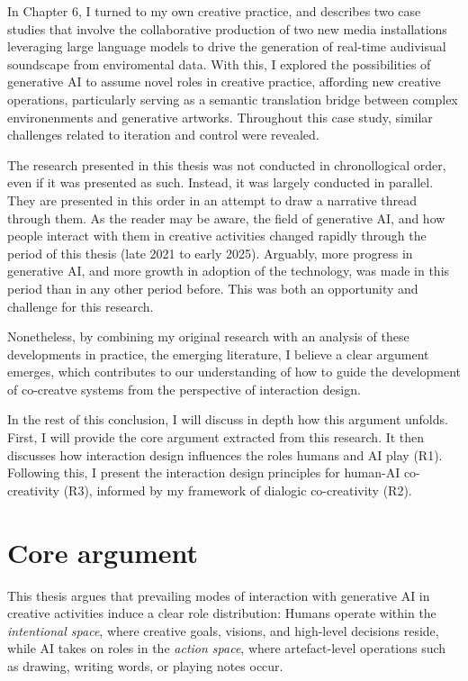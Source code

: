 In Chapter 6, I turned to my own creative practice, and describes two case studies that involve the collaborative production of two new media installations leveraging large language models to drive the generation of real-time audivisual soundscape from enviromental data. With this, I explored the possibilities of generative AI to assume novel roles in creative practice, affording new creative operations, particularly serving as a semantic translation bridge between complex environenments and generative artworks. Throughout this case study, similar challenges related to iteration and control were revealed. 

The research presented in this thesis was not conducted in chronollogical order, even if it was presented as such. Instead, it was largely conducted in parallel. They are presented in this order in an attempt to draw a narrative thread through them. As the reader may be aware, the field of generative AI, and how people interact with them in creative activities changed rapidly through the period of this thesis (late 2021 to early 2025). Arguably, more progress in generative AI, and more growth in adoption of the technology, was made in this period than in any other period before. This was both an opportunity and challenge for this research.

Nonetheless, by combining my original research with an analysis of these developments in practice, the emerging literature, I believe a clear argument emerges, which contributes to our understanding of how to guide the development of co-creatve systems from the perspective of interaction design. 

In the rest of this conclusion, I will discuss in depth how this argument unfolds. 
First, I will provide the core argument extracted from this research. It then discusses how interaction design influences the roles humans and AI play (R1). Following this, I present the interaction design principles for human-AI co-creativity (R3), informed by my framework of dialogic co-creativity (R2).

\section{Core argument}

This thesis argues that prevailing modes of interaction with generative AI in creative activities induce a clear role distribution: Humans operate within the \textit{intentional space}, where creative goals, visions, and high-level decisions reside, while AI takes on roles in the \textit{action space}, where artefact-level operations such as drawing, writing words, or playing notes occur.

